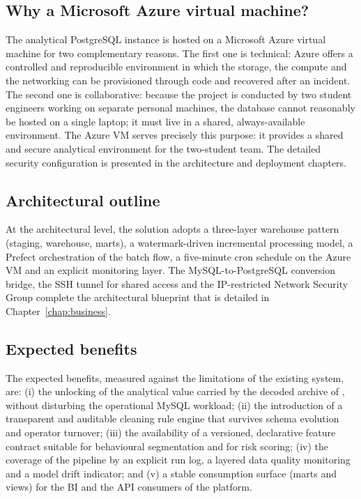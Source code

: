 \subsection{Why a Microsoft Azure virtual machine?}
The analytical PostgreSQL instance is hosted on a Microsoft Azure virtual machine for two complementary reasons. The first one is technical: Azure offers a controlled and reproducible environment in which the storage, the compute and the networking can be provisioned through code and recovered after an incident. The second one is collaborative: because the project is conducted by two student engineers working on separate personal machines, the database cannot reasonably be hosted on a single laptop; it must live in a shared, always-available environment. The Azure VM serves precisely this purpose: it provides a shared and secure analytical environment for the two-student team. The detailed security configuration is presented in the architecture and deployment chapters.

\subsection{Architectural outline}
At the architectural level, the solution adopts a three-layer warehouse pattern (staging, warehouse, marts), a watermark-driven incremental processing model, a Prefect orchestration of the batch flow, a five-minute cron schedule on the Azure VM and an explicit monitoring layer. The MySQL-to-PostgreSQL conversion bridge, the SSH tunnel for shared access and the IP-restricted Network Security Group complete the architectural blueprint that is detailed in Chapter~\ref{chap:business}.

\subsection{Expected benefits}
The expected benefits, measured against the limitations of the existing system, are: (i) the unlocking of the analytical value carried by the decoded archive of \hostorg, without disturbing the operational MySQL workload; (ii) the introduction of a transparent and auditable cleaning rule engine that survives schema evolution and operator turnover; (iii) the availability of a versioned, declarative feature contract suitable for behavioural segmentation and for risk scoring; (iv) the coverage of the pipeline by an explicit run log, a layered data quality monitoring and a model drift indicator; and (v) a stable consumption surface (marts and views) for the BI and the API consumers of the platform.

